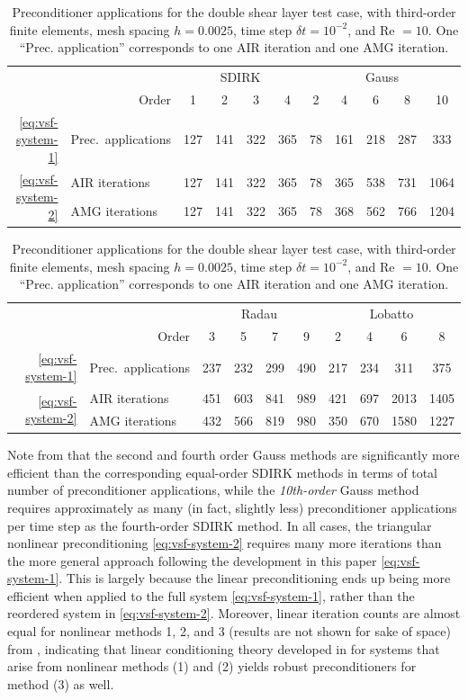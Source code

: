 \documentclass[review]{siamart}
\begin{document}
\begin{table}[h!]
	\centering
	\caption{Preconditioner applications for the double shear layer test case, with third-order
	finite elements, mesh spacing $h=0.0025$, time step $\delta t = 10^{-2}$, and Re $=10$. One
	``Prec. application'' corresponds to one AIR iteration and one AMG iteration.}
	\label{tab:dsl-iters}
	\begin{tabular}{rl|cccc|ccccc}
		\toprule
		&& \multicolumn{4}{c|}{SDIRK} & \multicolumn{5}{c}{Gauss} \\
		& \multicolumn{1}{r|}{Order}  & 1 & 2 & 3 & 4 & 2 & 4 & 6 & 8 & 10\\
		\midrule
		\eqref{eq:vsf-system-1} & Prec.\ applications & 127 & 141 & 322 & 365 & 78 & 161 & 218 & 287 & 333 \\
		\midrule
		\multirow{2}{*}{\eqref{eq:vsf-system-2}} & AIR iterations & 127 & 141 & 322 & 365 & 78 & 365 & 538 & 731 & 1064\\
		& AMG iterations & 127 & 141 & 322 & 365 & 78 & 368 & 562 & 766 & 1204 \\
		\bottomrule
	\end{tabular}

	\vspace{\floatsep}

	\begin{tabular}{rl|cccc|cccc}
		\toprule
		&& \multicolumn{4}{c|}{Radau} & \multicolumn{4}{c}{Lobatto} \\
		& \multicolumn{1}{r|}{Order} & 3 & 5 & 7 & 9 & 2 & 4 & 6 & 8\\
		\midrule
		\eqref{eq:vsf-system-1} & Prec.\ applications & 237 & 232 & 299 & 490 & 217 & 234 & 311 & 375 \\
		\midrule
		\multirow{2}{*}{\eqref{eq:vsf-system-2}} & AIR iterations & 451 & 603 & 841 & 989 & 421 & 697 & 2013 & 1405 \\
		& AMG iterations & 432 & 566 & 819 & 980 & 350 & 670 & 1580 & 1227\\
		\bottomrule
	\end{tabular}
\end{table}

Note from  that the second and fourth order Gauss methods
are significantly more efficient than the corresponding equal-order SDIRK
methods in terms of total number of preconditioner applications, while the
\textit{10th-order} Gauss method requires approximately as many (in fact,
slightly less) preconditioner applications per time step as the fourth-order
SDIRK method. In all cases, the triangular nonlinear preconditioning
\eqref{eq:vsf-system-2} requires many more iterations than the more general
approach following the development in this paper \eqref{eq:vsf-system-1}. This
is largely because the linear preconditioning ends up being more efficient
when applied to the full system \eqref{eq:vsf-system-1}, rather than the
reordered system in \eqref{eq:vsf-system-2}. Moreover, linear iteration
counts are almost equal for nonlinear methods 1, 2, and 3 (results are not
shown for sake of space) from , indicating that
linear conditioning theory developed in  for systems
that arise from nonlinear methods (1) and (2) yields robust preconditioners for
method (3) as well.
\end{document}
